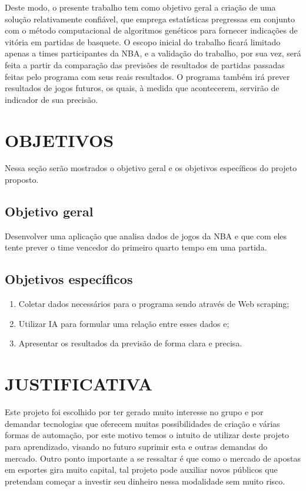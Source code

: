 \documentclass[brazilian]{ifsc-tcc}
\begin{document}
Deste modo, o presente trabalho tem como objetivo geral a criação de uma solução relativamente confiável, que emprega estatísticas pregressas em conjunto com o método computacional de algoritmos genéticos para fornecer indicações de vitória em partidas de basquete. O escopo inicial do trabalho ficará limitado apenas a times participantes da NBA, e a validação do trabalho, por sua vez, será feita a partir da comparação das previsões de resultados de partidas passadas feitas pelo programa com seus reais resultados. O programa também irá prever resultados de jogos futuros, os quais, à medida que acontecerem, servirão de indicador de sua precisão.


\section{OBJETIVOS}
Nessa seção serão mostrados o objetivo geral e os objetivos específicos do projeto proposto.

\subsection{Objetivo geral}
Desenvolver uma aplicação que analisa dados de jogos da NBA e que com eles tente prever o time vencedor do primeiro quarto tempo em uma partida.

\subsection{Objetivos específicos}

\begin{enumerate}
\item Coletar dados necessários para o programa sendo através de Web scraping;
\item Utilizar IA para formular uma relação entre esses dados e;
\item Apresentar os resultados da previsão de forma clara e precisa.
\end{enumerate}

\section{JUSTIFICATIVA}

Este projeto foi escolhido por ter gerado muito interesse no grupo e por demandar tecnologias que oferecem muitas possibilidades de criação e várias formas de automação, por este motivo temos o intuito de utilizar deste projeto para aprendizado, visando no futuro suprimir esta e outras demandas do mercado. Outro ponto importante a se ressaltar é que como o mercado de apostas em esportes gira muito capital, tal projeto pode auxiliar novos públicos que pretendam começar a investir seu dinheiro nessa modalidade sem muito risco. 
\end{document}
